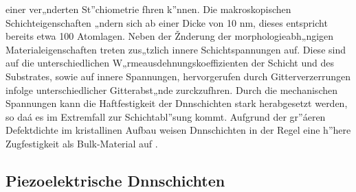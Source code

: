 einer ver„nderten St”chiometrie fhren k”nnen.  Die makroskopischen
Schichteigenschaften „ndern sich ab einer Dicke von 10 nm,
dieses entspricht bereits etwa 100 Atomlagen. Neben der
Žnderung der morphologieabh„ngigen Materialeigenschaften treten
zus„tzlich innere Schichtspannungen auf.  Diese sind auf die
unterschiedlichen W„rmeausdehnungskoeffizienten der Schicht und des
Substrates, sowie auf innere Spannungen, hervorgerufen durch
Gitterverzerrungen infolge unterschiedlicher Gitterabst„nde
zurckzufhren. Durch die mechanischen Spannungen kann die
Haftfestigkeit der Dnnschichten stark herabgesetzt werden, so daá es im
Extremfall zur Schichtabl”sung kommt.  Aufgrund der gr”áeren
Defektdichte im kristallinen Aufbau weisen Dnnschichten in der Regel
eine h”here Zugfestigkeit als Bulk-Material auf \cite{Gra91}.



\subsection{Piezoelektrische Dnnschichten}

